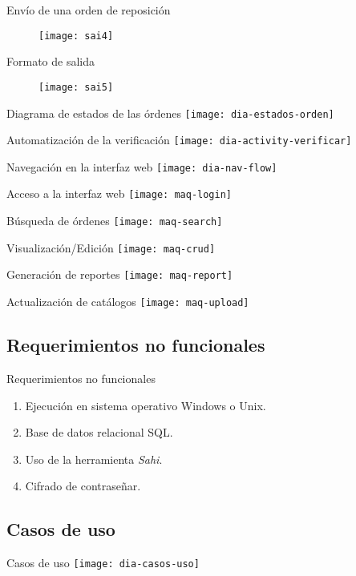	\begin{frame}{Envío de una orden de reposición}
		\begin{figure}[H]
		\centering
		\texttt{[image: sai4]}
		\label{fig:sai4}
		\end{figure}
	\end{frame}
	\begin{frame}{Formato de salida}
		\begin{figure}[H]
		\centering
		\texttt{[image: sai5]}
		\label{fig:sai5}
		\end{figure}
	\end{frame}
	\begin{frame}{Diagrama de estados de las órdenes}
		\centering
		\texttt{[image: dia-estados-orden]} 
	\end{frame}
	\begin{frame}{Automatización de la verificación}
		\centering
		\texttt{[image: dia-activity-verificar]}
	\end{frame}
	\begin{frame}{Navegación en la interfaz web}
		\centering
		\texttt{[image: dia-nav-flow]}
	\end{frame}
	\begin{frame}{Acceso a la interfaz web}
		\centering
		\texttt{[image: maq-login]} 
	\end{frame}
	\begin{frame}{Búsqueda de órdenes}
		\centering
		\texttt{[image: maq-search]} 
	\end{frame}
	\begin{frame}{Visualización/Edición}
		\centering
		\texttt{[image: maq-crud]} 
	\end{frame}
	\begin{frame}{Generación de reportes}
		\centering
		\texttt{[image: maq-report]} 
	\end{frame}
	\begin{frame}{Actualización de catálogos}
		\centering
		\texttt{[image: maq-upload]}
	\end{frame}

\subsection{Requerimientos no funcionales}
	\begin{frame}{Requerimientos no funcionales}
		\begin{enumerate}
			\item Ejecución en sistema operativo Windows\textsuperscript{\textcopyright} o Unix.
			\item Base de datos relacional SQL.
			\item Uso de la herramienta \textit{Sahi}.
			\item Cifrado de contraseñar.
		\end{enumerate}
	\end{frame}

\subsection{Casos de uso}
	\begin{frame}{Casos de uso}
		\centering
		\texttt{[image: dia-casos-uso]} 
	\end{frame}


